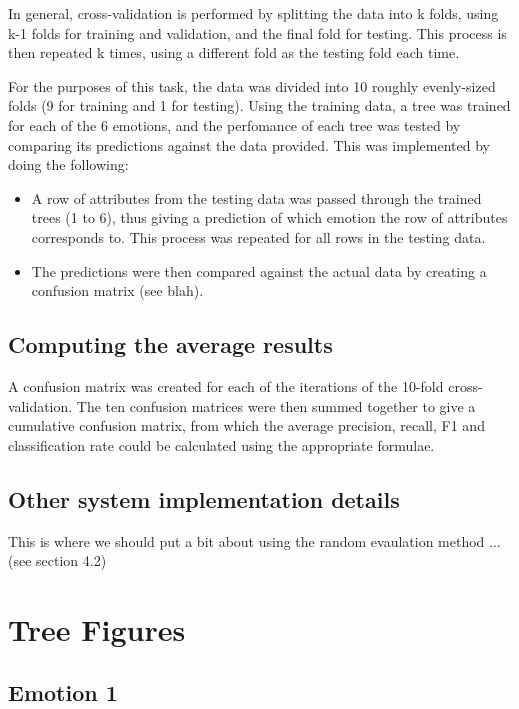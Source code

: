 \documentclass[a4paper,11pt]{article}
\begin{document}
In general, cross-validation is performed by splitting the data into k folds, using k-1 folds for training and validation, and the final fold for testing. This process is then repeated k times, using a different fold as the testing fold each time.

For the purposes of this task, the data was divided into 10 roughly evenly-sized folds (9 for training and 1 for testing). Using the training data, a tree was trained for each of the 6 emotions, and the perfomance of each tree was tested by comparing its predictions against the data provided. This was implemented by doing the following:

\begin{itemize}
	\item A row of attributes from the testing data was passed through the trained trees (1 to 6), thus giving a prediction of which emotion the row of attributes corresponds to. This process was repeated for all rows in the testing data.
	\item The predictions were then compared against the actual data by creating a confusion matrix (see blah).
\end{itemize}

\subsection{Computing the average results}

A confusion matrix was created for each of the iterations of the 10-fold cross-validation. The ten confusion matrices were then summed together to give a cumulative confusion matrix, from which the average precision, recall, F1 and classification rate could be calculated using the appropriate formulae.

\subsection{Other system implementation details}

This is where we should put a bit about using the random evaulation method ... (see section 4.2)

\section{Tree Figures}

\subsection{Emotion 1}
\end{document}
